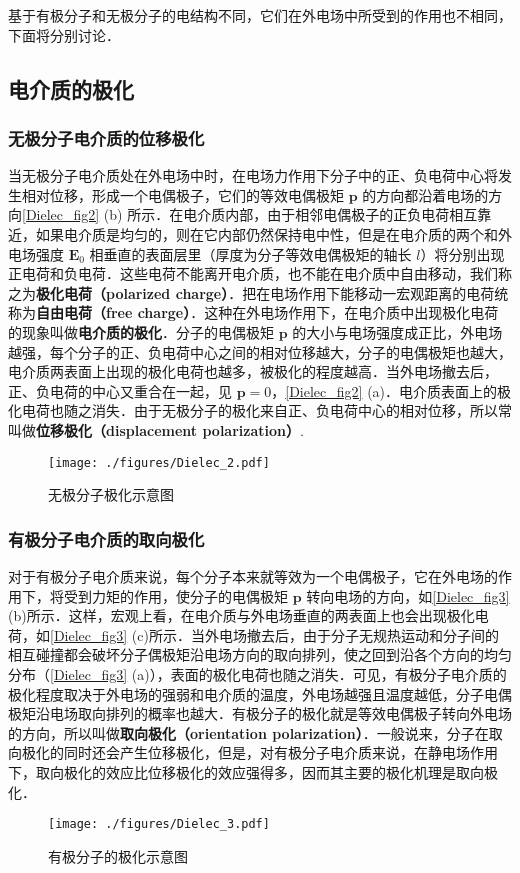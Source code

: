 基于有极分子和无极分子的电结构不同，它们在外电场中所受到的作用也不相同，下面将分别讨论．

\subsection{电介质的极化}

\subsubsection{无极分子电介质的位移极化}

当无极分子电介质处在外电场中时，在电场力作用下分子中的正、负电荷中心将发生相对位移，形成一个电偶极子，它们的等效电偶极矩 $\mathbf p$ 的方向都沿着电场的方向\autoref{Dielec_fig2} (b) 所示．在电介质内部，由于相邻电偶极子的正负电荷相互靠近，如果电介质是均匀的，则在它内部仍然保持电中性，但是在电介质的两个和外电场强度 $\mathbf E_0$ 相垂直的表面层里（厚度为分子等效电偶极矩的轴长 $l$）将分别出现正电荷和负电荷．这些电荷不能离开电介质，也不能在电介质中自由移动，我们称之为\textbf{极化电荷（polarized charge）}．把在电场作用下能移动一宏观距离的电荷统称为\textbf{自由电荷（free charge）}．这种在外电场作用下，在电介质中出现极化电荷的现象叫做\textbf{电介质的极化}．分子的电偶极矩 $\mathbf p $ 的大小与电场强度成正比，外电场越强，每个分子的正、负电荷中心之间的相对位移越大，分子的电偶极矩也越大，电介质两表面上出现的极化电荷也越多，被极化的程度越高．当外电场撤去后，正、负电荷的中心又重合在一起，见 $\mathbf p=0$，\autoref{Dielec_fig2} (a)．电介质表面上的极化电荷也随之消失．由于无极分子的极化来自正、负电荷中心的相对位移，所以常叫做\textbf{位移极化（displacement polarization）}.
\begin{figure}[ht]
\centering
\texttt{[image: ./figures/Dielec\_2.pdf]}
\caption{无极分子极化示意图} \label{Dielec_fig2}
\end{figure}

\subsubsection{有极分子电介质的取向极化}

对于有极分子电介质来说，每个分子本来就等效为一个电偶极子，它在外电场的作用下，将受到力矩的作用，使分子的电偶极矩 $\mathbf p$ 转向电场的方向，如\autoref{Dielec_fig3} (b)所示．这样，宏观上看，在电介质与外电场垂直的两表面上也会出现极化电荷，如\autoref{Dielec_fig3} (c)所示．当外电场撤去后，由于分子无规热运动和分子间的相互碰撞都会破坏分子偶极矩沿电场方向的取向排列，使之回到沿各个方向的均匀分布（\autoref{Dielec_fig3} (a)），表面的极化电荷也随之消失．可见，有极分子电介质的极化程度取决于外电场的强弱和电介质的温度，外电场越强且温度越低，分子电偶极矩沿电场取向排列的概率也越大．有极分子的极化就是等效电偶极子转向外电场的方向，所以叫做\textbf{取向极化（orientation polarization）}．一般说来，分子在取向极化的同时还会产生位移极化，但是，对有极分子电介质来说，在静电场作用下，取向极化的效应比位移极化的效应强得多，因而其主要的极化机理是取向极化．
\begin{figure}[ht]
\centering
\texttt{[image: ./figures/Dielec\_3.pdf]}
\caption{有极分子的极化示意图} \label{Dielec_fig3}
\end{figure}

